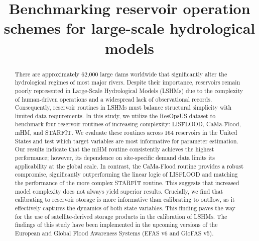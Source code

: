 \documentclass[hess, manuscript]{copernicus}
\begin{document}
\title{Benchmarking reservoir operation schemes for large-scale hydrological models}




\received{}
\pubdiscuss{} %
\revised{}
\accepted{}
\published{}



\maketitle



\begin{abstract}
There are approximately 62,000 large dams worldwide that significantly alter the hydrological regimes of most major rivers. Despite their importance, reservoirs remain poorly represented in Large-Scale Hydrological Models (LSHMs) due to the complexity of human-driven operations and a widespread lack of observational records. Consequently, reservoir routines in LSHMs must balance structural simplicity with limited data requirements. In this study, we utilize the ResOpsUS dataset to benchmark four reservoir routines of increasing complexity: LISFLOOD, CaMa-Flood, mHM, and STARFIT. We evaluate these routines across 164 reservoirs in the United States and test which target variables are most informative for parameter estimation. Our results indicate that the mHM routine consistently achieves the highest performance; however, its dependence on site-specific demand data limits its applicability at the global scale. In contrast, the CaMa-Flood routine provides a robust compromise, significantly outperforming the linear logic of LISFLOOD and matching the performance of the more complex STARFIT routine. This suggests that increased model complexity does not always yield superior results. Crucially, we find that calibrating to reservoir storage is more informative than calibrating to outflow, as it effectively captures the dynamics of both state variables. This finding paves the way for the use of satellite-derived storage products in the calibration of LSHMs. The findings of this study have been implemented in the upcoming versions of the European and Global Flood Awareness Systems (EFAS v6 and GloFAS v5).
\end{abstract}
\end{document}

